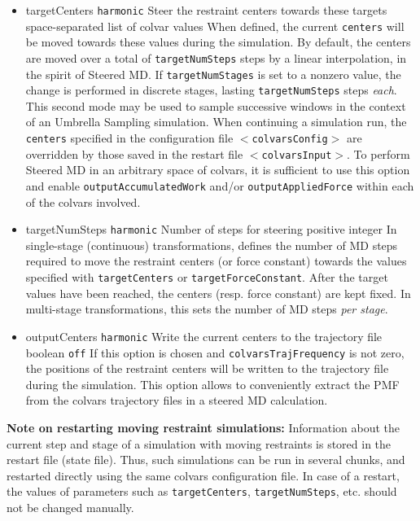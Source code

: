 \begin{itemize}

\item %
  \key
    {targetCenters}{%
    \texttt{harmonic}}{%
    Steer the restraint centers towards these
    targets}{%
    space-separated list of colvar values}{%
    When defined, the current \texttt{centers} will be moved towards
    these values during the simulation.
    By default, the centers are moved over a total of
    \texttt{targetNumSteps} steps by a linear interpolation, in the
    spirit of Steered MD.
    If \texttt{targetNumStages} is set to a nonzero value, the
    change is performed in discrete stages, lasting \texttt{targetNumSteps}
    steps \emph{each}. This second mode may be used to sample successive
    windows in the context
    of an Umbrella Sampling simulation.
    When continuing a simulation
    run, the \texttt{centers} specified in the configuration file
    \texttt{$<$colvarsConfig$>$} are overridden by those saved in
    the restart file \texttt{$<$colvarsInput$>$}.
    To perform Steered MD in an arbitrary space of colvars, it is sufficient
    to use this option and enable \texttt{outputAccumulatedWork} and/or
    \texttt{outputAppliedForce} within each of the colvars involved.}

\item %
  \key
    {targetNumSteps}{%
    \texttt{harmonic}}{%
    Number of steps for steering}{%
    positive integer}{%
    In single-stage (continuous) transformations, defines the number of MD
    steps required to move the restraint centers (or force constant)
    towards the values specified with \texttt{targetCenters} or
    \texttt{targetForceConstant}.
    After the target values have been reached, the centers (resp. force
    constant) are kept fixed. In multi-stage transformations, this sets the
    number of MD steps \emph{per stage}.}

\item %
  \keydef
    {outputCenters}{%
    \texttt{harmonic}}{%
    Write the current centers to the trajectory file}{%
    boolean}{%
    \texttt{off}}{%
    If this option is chosen and  \texttt{colvarsTrajFrequency} is not zero, the positions of the restraint centers will be written to the trajectory file during the simulation.
    This option allows to conveniently extract the PMF from the colvars trajectory files in a steered MD calculation.
}

\end{itemize}

\textbf{Note on restarting moving restraint simulations:} Information
about the current step and stage of a simulation with moving restraints
is stored in the restart file (state file). Thus, such simulations can
be run in several chunks, and restarted directly using the same colvars
configuration file. In case of a restart, the values of parameters such
as \texttt{targetCenters}, \texttt{targetNumSteps}, etc. should not be
changed manually.


